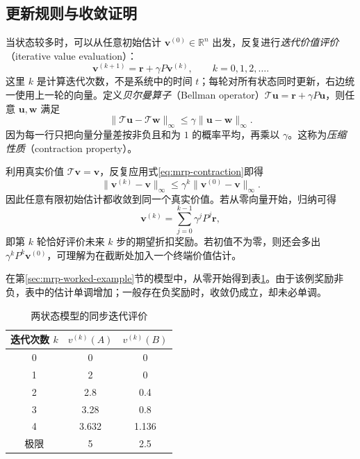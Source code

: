 \documentclass[UTF8,12pt,a4paper,fontset=fandol]{ctexart}
\begin{document}
\subsection{更新规则与收敛证明}

当状态较多时，可以从任意初始估计 $\boldsymbol v^{(0)}\in\mathbb R^n$ 出发，反复进行\emph{迭代价值评价}（iterative value evaluation）：
\begin{equation}
  \boldsymbol v^{(k+1)}=\boldsymbol r+\gamma P\boldsymbol v^{(k)},
  \qquad k=0,1,2,\ldots.
  \label{eq:mrp-iteration}
\end{equation}
这里 $k$ 是计算迭代次数，不是系统中的时间 $t$；每轮对所有状态同时更新，右边统一使用上一轮的向量。定义\emph{贝尔曼算子}（Bellman operator）$\mathcal T\boldsymbol u=\boldsymbol r+\gamma P\boldsymbol u$，则任意 $\boldsymbol u,\boldsymbol w$ 满足
\begin{equation}
  \|\mathcal T\boldsymbol u-\mathcal T\boldsymbol w\|_\infty
  \leq\gamma\|\boldsymbol u-\boldsymbol w\|_\infty.
  \label{eq:mrp-contraction}
\end{equation}
因为每一行只把向量分量差按非负且和为 $1$ 的概率平均，再乘以 $\gamma$。这称为\emph{压缩性质}（contraction property）。

利用真实价值 $\mathcal T\boldsymbol v=\boldsymbol v$，反复应用式\eqref{eq:mrp-contraction}即得
\begin{equation}
  \|\boldsymbol v^{(k)}-\boldsymbol v\|_\infty
  \leq\gamma^k\|\boldsymbol v^{(0)}-\boldsymbol v\|_\infty.
  \label{eq:mrp-iteration-error}
\end{equation}
因此任意有限初始估计都收敛到同一个真实价值。若从零向量开始，归纳可得
\begin{equation}
  \boldsymbol v^{(k)}=\sum_{j=0}^{k-1}\gamma^jP^j\boldsymbol r,
  \label{eq:mrp-finite-step}
\end{equation}
即第 $k$ 轮恰好评价未来 $k$ 步的期望折扣奖励。若初值不为零，则还会多出 $\gamma^kP^k\boldsymbol v^{(0)}$，可理解为在截断处加入一个终端价值估计。

在第\ref{sec:mrp-worked-example}节的模型中，从零开始得到表\ref{tab:mrp-iterations}。由于该例奖励非负，表中的估计单调增加；一般存在负奖励时，收敛仍成立，却未必单调。
\begin{table}
  \centering
  \caption{两状态模型的同步迭代评价}
  \label{tab:mrp-iterations}
  \begin{tabular}{c c c}
    \toprule
    迭代次数 $k$ & $v^{(k)}(A)$ & $v^{(k)}(B)$ \\
    \midrule
    0 & 0 & 0 \\
    1 & 2 & 0 \\
    2 & 2.8 & 0.4 \\
    3 & 3.28 & 0.8 \\
    4 & 3.632 & 1.136 \\
    极限 & 5 & 2.5 \\
    \bottomrule
  \end{tabular}
\end{table}
\end{document}
